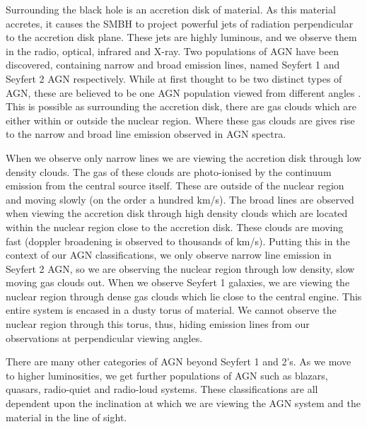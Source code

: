 Surrounding the black hole is an accretion disk of material. As this material accretes, it causes the SMBH to project powerful jets of radiation perpendicular to the accretion disk plane. These jets are highly luminous, and we observe them in the radio, optical, infrared and X-ray. Two populations of AGN have been discovered, containing narrow and broad emission lines, named Seyfert 1 and Seyfert 2 AGN respectively. While at first thought to be two distinct types of AGN, these are believed to be one AGN population viewed from different angles \citep[for a review of the unification, see][]{2015ARA&A..53..365N}. This is possible as surrounding the accretion disk, there are gas clouds which are either within or outside the nuclear region. Where these gas clouds are gives rise to the narrow and broad line emission observed in AGN spectra. 

When we observe only narrow lines we are viewing the accretion disk through low density clouds. The gas of these clouds are photo-ionised by the continuum emission from the central source itself. These are outside of the nuclear region and moving slowly (on the order a hundred km/s). The broad lines are observed when viewing the accretion disk through high density clouds which are located within the nuclear region close to the accretion disk. These clouds are moving fast (doppler broadening is observed to thousands of km/s). Putting this in the context of our AGN classifications, we only observe narrow line emission in Seyfert 2 AGN, so we are observing the nuclear region through low density, slow moving gas clouds out. When we observe Seyfert 1 galaxies, we are viewing the nuclear region through dense gas clouds which lie close to the central engine. This entire system is encased in a dusty torus of material. We cannot observe the nuclear region through this torus, thus, hiding emission lines from our observations at perpendicular viewing angles.

There are many other categories of AGN beyond Seyfert 1 and 2's. As we move to higher luminosities, we get further populations of AGN such as blazars, quasars, radio-quiet and radio-loud systems. These classifications are all dependent upon the inclination at which we are viewing the AGN system and the material in the line of sight.

